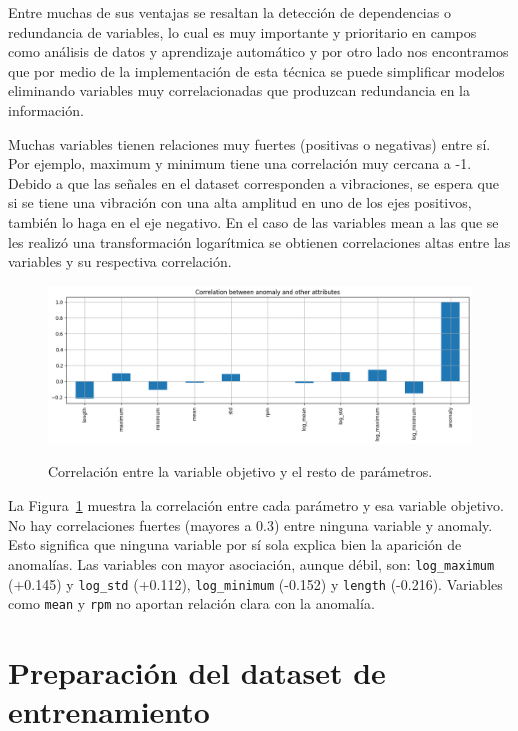 \documentclass[11pt,a4paper,spanish]{book}
\numberwithin{equation}{chapter}
\numberwithin{figure}{chapter}
\begin{document}
Entre muchas de sus ventajas se resaltan la detección de dependencias o redundancia de 
variables, lo cual es muy importante y prioritario en campos como análisis de datos y 
aprendizaje automático y por otro lado nos encontramos que por medio de la implementación
de esta técnica se puede simplificar modelos eliminando variables muy correlacionadas que 
produzcan redundancia en la información. \cite{Alvarez2023}


Muchas variables tienen relaciones muy fuertes (positivas o negativas) entre sí. 
Por ejemplo,  maximum y minimum tiene una correlación muy cercana a -1. 
Debido a que las señales en el dataset corresponden a vibraciones, se espera que si se 
tiene una vibración con una alta amplitud en uno de los ejes positivos, 
también lo haga en el eje negativo. En el caso de las variables mean a las que se les 
realizó una transformación logarítmica se obtienen correlaciones altas entre 
las variables y su respectiva correlación. 


\begin{figure}[h]
    \caption{Correlación entre la variable objetivo y el resto de parámetros.}
    \centering
    \includegraphics[width=1\textwidth]{media/dataset/corr-mat-target.png}
    \label{fig:figCorrMatTarget}
\end{figure}


La Figura~\ref{fig:figCorrMatTarget} muestra 
la correlación entre cada parámetro y esa variable objetivo. No hay correlaciones fuertes
(mayores a 0.3) entre ninguna variable y anomaly. 
Esto significa que ninguna variable por sí sola explica bien la aparición de anomalías. 
Las variables con mayor asociación, aunque débil, son: \lstinline|log_maximum| (+0.145) y 
\lstinline|log_std| (+0.112), \lstinline|log_minimum| (-0.152) y \lstinline|length| (-0.216).
Variables como \lstinline|mean| y \lstinline|rpm| no aportan relación clara con la anomalía.





\section{Preparación del dataset de entrenamiento}
\end{document}

